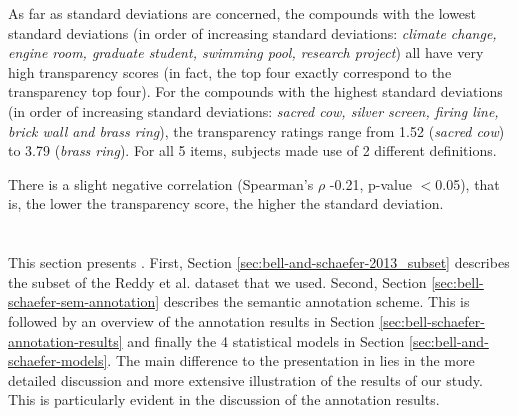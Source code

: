 As far as standard deviations are concerned, the compounds with the
lowest standard deviations (in order of increasing
standard deviations: \emph{climate change, engine room, graduate
student, swimming pool, research project}) all have very high transparency scores (in fact,
the top four exactly correspond to the transparency top four). For the
compounds with the highest standard deviations (in order of increasing
standard deviations: \emph{sacred cow, silver
screen, firing line, brick wall and brass ring}), the transparency ratings
range from 1.52 (\emph{sacred cow}) to 3.79 (\emph{brass ring}). For
all 5 items, subjects made use of 2 different definitions.

There is a slight negative correlation (Spearman's $\rho$ -0.21, p-value $<$0.05), that is, the lower the transparency score, the higher the standard deviation. 


\section{\citet{BellandSchaefer:2013}}
\label{sec:bell-and-schaefer-2013}

This section presents \citet{BellandSchaefer:2013}. First, Section
\ref{sec:bell-and-schaefer-2013_subset} describes the subset of the Reddy
et al. dataset that we used. Second, Section
\ref{sec:bell-schaefer-sem-annotation} describes the semantic annotation
scheme. This is followed by an overview of the
annotation results in Section
\ref{sec:bell-schaefer-annotation-results} and finally the 4 statistical models in
Section \ref{sec:bell-and-schaefer-models}. The main difference to the
presentation in \citet{BellandSchaefer:2013} lies in the more detailed
discussion and more extensive illustration of the results of our
study. This is particularly evident in the discussion of the annotation results.

